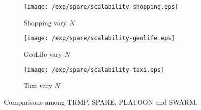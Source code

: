 \begin{figure}
\begin{subfigure}[b]{0.32\textwidth}
        \texttt{[image: /exp/spare/scalability-shopping.eps]}
        \caption{Shopping vary $N$}
    \end{subfigure} 
    \begin{subfigure}[b]{0.32\textwidth}
        \texttt{[image: /exp/spare/scalability-geolife.eps]}
        \caption{GeoLife vary $N$}
    \end{subfigure} 
    \begin{subfigure}[b]{0.32\textwidth}
        \texttt{[image: /exp/spare/scalability-taxi.eps]}
        \caption{Taxi vary $N$}
    \end{subfigure} 
 \caption{Comparisons among TRMP, SPARE, PLATOON and SWARM.}
 \label{exp:scalability}
\end{figure}
